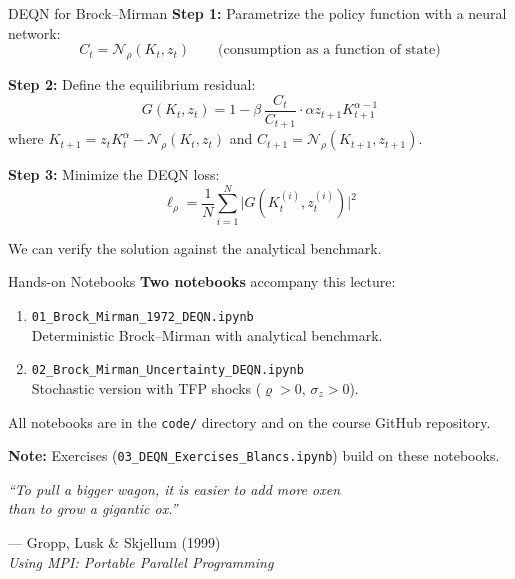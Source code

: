 \documentclass[aspectratio=169,11pt]{beamer}
\newcommand{\emphc}[1]{\textcolor{harvardcrimson}{#1}}
\begin{document}
\begin{frame}{DEQN for Brock--Mirman}
\textbf{Step 1:} Parametrize the policy function with a neural network:
\[
C_t = \mathcal{N}_\rho(K_t, z_t) \qquad\text{(consumption as a function of state)}
\]

\vspace{0.3em}
\textbf{Step 2:} Define the equilibrium residual:
\[
G(K_t, z_t) = 1 - \beta \, \frac{C_t}{C_{t+1}} \cdot \alpha z_{t+1} K_{t+1}^{\alpha-1}
\]
where $K_{t+1} = z_t K_t^\alpha - \mathcal{N}_\rho(K_t, z_t)$ and $C_{t+1} = \mathcal{N}_\rho(K_{t+1}, z_{t+1})$.

\vspace{0.3em}
\textbf{Step 3:} Minimize the DEQN loss:
\[
\ell_\rho = \frac{1}{N}\sum_{i=1}^{N} \bigl|G(K_t^{(i)}, z_t^{(i)})\bigr|^2
\]

{\small We can \emphc{verify} the solution against the analytical benchmark.}
\end{frame}

\begin{frame}{Hands-on Notebooks}
\textbf{Two notebooks} accompany this lecture:

\vspace{0.5em}
\begin{enumerate}
    \item \texttt{01\_Brock\_Mirman\_1972\_DEQN.ipynb}\\
    {\small Deterministic Brock--Mirman with analytical benchmark.}

    \vspace{0.3em}
    \item \texttt{02\_Brock\_Mirman\_Uncertainty\_DEQN.ipynb}\\
    {\small Stochastic version with TFP shocks ($\varrho > 0$, $\sigma_z > 0$).}
\end{enumerate}

\vspace{0.5em}
All notebooks are in the \texttt{code/} directory and on the course GitHub repository.

\vspace{0.5em}
{\small \textbf{Note:} Exercises (\texttt{03\_DEQN\_Exercises\_Blancs.ipynb}) build on these notebooks.}
\end{frame}

\begin{frame}{}
\vfill
\begin{center}
{\Large\itshape
``To pull a bigger wagon, it is easier to add more oxen\\
than to grow a gigantic ox.''}

\vspace{0.8cm}
{\normalsize --- Gropp, Lusk \& Skjellum (1999)}\\[4pt]
{\small\itshape Using MPI: Portable Parallel Programming}
\end{center}
\vfill
\end{frame}
\end{document}
